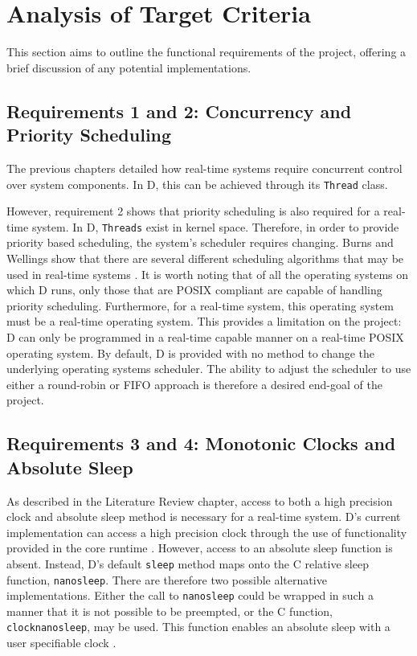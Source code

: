 \section{Analysis of Target Criteria} 
This section aims to outline the functional requirements of the project,
offering a brief discussion of any potential implementations.

\subsection{Requirements 1 and 2: Concurrency and Priority Scheduling} %
The previous chapters detailed how real-time systems require concurrent control
over system components. In D, this can be achieved through its \texttt{Thread} class. 
\par\bigskip\noindent
However, requirement 2 shows that priority scheduling is also required for a
real-time system. 
In D, \texttt{Threads} exist in kernel space. Therefore, in order to
provide priority based scheduling, the system's scheduler requires changing. Burns
and Wellings show that there are several different scheduling algorithms that
may be used in real-time systems \cite{real-time-systems}. It is worth noting
that of all the operating systems on which D runs, only those that are POSIX
compliant are capable of handling priority scheduling. Furthermore, for a
real-time system, this operating system must be a real-time operating system.
This provides a limitation on the project: D can only be programmed in a real-time
capable manner on a real-time POSIX operating system. 
By default, D is provided with no method to change the underlying operating
systems scheduler. 
The ability to adjust the scheduler to use either a round-robin or FIFO approach 
is therefore a desired end-goal of the project.

\subsection{Requirements 3 and 4: Monotonic Clocks and Absolute Sleep} 
As described in the Literature Review chapter, access to both a high precision
clock and absolute sleep method is necessary for a real-time system. D's
current implementation can access a high precision clock through the use of
functionality provided in the core runtime \cite{dlang-core-time}. However,
access to an absolute sleep function is absent. Instead, D's default
\texttt{sleep}
method maps onto the C relative sleep function, \texttt{nanosleep}. There are
therefore two possible alternative implementations. Either the call to
\texttt{nanosleep} could be wrapped in such a manner that it is not possible to be preempted, 
or the C function, \texttt{clock\textunderscore{}nanosleep}, may be used. This function enables 
an absolute sleep with a user specifiable clock \cite{clock-nanosleep}. 


